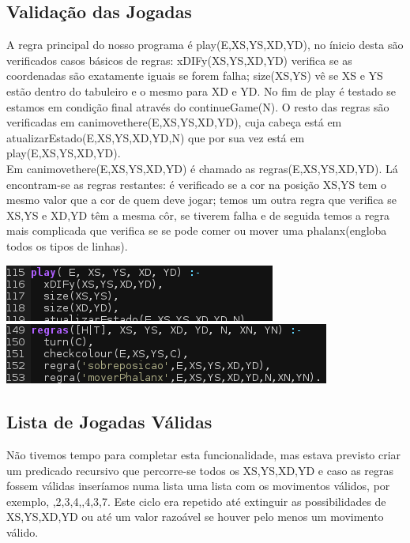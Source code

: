 \documentclass[a4paper]{article}
\begin{document}
\subsection{Validação das Jogadas}
A regra principal do nosso programa é play(E,XS,YS,XD,YD), no ínicio desta são verificados casos básicos de regras: xDIFy(XS,YS,XD,YD) verifica se as coordenadas são exatamente iguais se forem falha; size(XS,YS) vê se XS e YS estão dentro do tabuleiro e o mesmo para XD e YD. No fim de play é testado se estamos em condição final através do continueGame(N). O resto das regras são verificadas em canimovethere(E,XS,YS,XD,YD), cuja cabeça está em atualizarEstado(E,XS,YS,XD,YD,N) que por sua vez está em play(E,XS,YS,XD,YD).
\\\linebreak
Em canimovethere(E,XS,YS,XD,YD) é chamado as regras(E,XS,YS,XD,YD). Lá encontram-se as regras restantes: é verificado se a cor na posição XS,YS tem o mesmo valor que a cor de quem deve jogar; temos um outra regra que verifica se XS,YS e XD,YD têm a mesma côr, se tiverem falha e de seguida temos a regra mais complicada que verifica se se pode comer ou mover uma phalanx(engloba todos os tipos de linhas).
\begin{center}
\includegraphics[scale=0.70]{regras1.png}
\includegraphics[scale=0.70]{regras.png}
\end{center}

\subsection{Lista de Jogadas Válidas}
Não tivemos tempo para completar esta funcionalidade, mas estava previsto criar um predicado recursivo que percorre-se todos os XS,YS,XD,YD e caso as regras fossem válidas inseríamos numa lista uma lista com os movimentos válidos, por exemplo, \lbrack{},2,3,4\rbrack,,4,3,7\rbrack\rbrack. Este ciclo era repetido até extinguir as possibilidades de XS,YS,XD,YD ou até um valor razoável se houver pelo menos um movimento válido.
\end{document}
